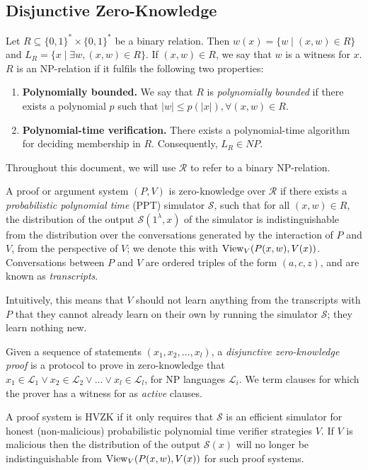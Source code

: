 \subsection{Disjunctive Zero-Knowledge}

\begin{definition}[NP Relations]
Let $R \subseteq \{0,1\}^* \times \{0,1\}^*$ be a binary relation. Then $w(x) = \{w \mid (x,w) \in R\}$ and $L_R = \{x \mid \exists w, (x,w) \in R\}$. If $(x,w) \in R$, we say that $w$ is a witness for $x$. $R$ is an NP-relation if it fulfils the following two properties:
\begin{enumerate}
    \item \textbf{Polynomially bounded.} We say that $R$ is \textit{polynomially bounded} if there exists a polynomial $p$ such that $|w| \le p(|x|), \forall (x,w) \in R$. 
    \item \textbf{Polynomial-time verification.} There exists a polynomial-time algorithm for deciding membership in $R$. Consequently, $L_R \in NP$. 
\end{enumerate}

Throughout this document, we will use $\mathcal R$ to refer to a binary NP-relation.
\end{definition}

\begin{definition}\label{def:zeroknowledge}
A proof or argument system $(P,V)$ is zero-knowledge over $\mathcal R$ if there exists a \textit{probabilistic polynomial time} (PPT) simulator $\mathcal S$, such that for all $(x,w) \in R$, the distribution of the output $\mathcal S(1^\lambda, x)$ of the simulator is indistinguishable from the distribution over the conversations generated by the interaction of $P$ and $V$, from the perspective of $V$; we denote this with $\text{View}_V(P(x,w),V(x))$. Conversations between $P$ and $V$ are ordered triples of the form $(a,c,z)$, and are known as \textit{transcripts}.
\end{definition}

Intuitively, this means that $V$ should not learn anything from the transcripts  with $P$ that they cannot already learn on their own by running the simulator $\mathcal S$; they learn nothing new.

\begin{definition}
Given a sequence of statements $(x_1,x_2,\ldots, x_l)$, a \textit{disjunctive zero-knowledge proof} is a protocol to prove in zero-knowledge that $x_1 \in \mathcal L_1 \lor x_2 \in \mathcal L_2 \lor \ldots \lor x_l \in \mathcal L_l$, for NP languages $\mathcal L_i$. We term clauses for which the prover has a witness for as \textit{active} clauses. 
\end{definition}

\begin{definition}
A proof system is HVZK if it only requires that $\mathcal S$ is an efficient simulator 
for honest (non-malicious) probabilistic polynomial time verifier strategies $V$. If $V$ is malicious then the distribution 
of the output $\mathcal S(x)$ will no longer be indistinguishable from $\text{View}_V(P(x,w),V(x))$ for such proof systems. 
\end{definition}
